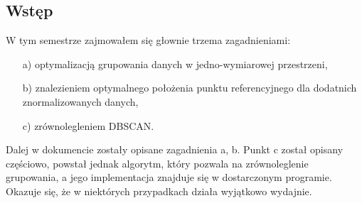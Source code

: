 \subsection*{Wstęp}
W tym semestrze zajmowałem się głownie trzema zagadnieniami: 
\begin{itemize}
	\item[a)]{optymalizacją grupowania danych w jedno-wymiarowej przestrzeni,}
	\item[b)]{znalezieniem optymalnego położenia punktu referencyjnego dla dodatnich znormalizowanych danych,}
	\item[c)]{zrównolegleniem DBSCAN.}
\end{itemize}
Dalej w dokumencie zostały opisane zagadnienia a, b. Punkt c został opisany częściowo, powstał jednak algorytm, który pozwala na zrównoleglenie grupowania, a jego implementacja znajduje się w dostarczonym programie. Okazuje się, że w niektórych przypadkach działa wyjątkowo wydajnie.